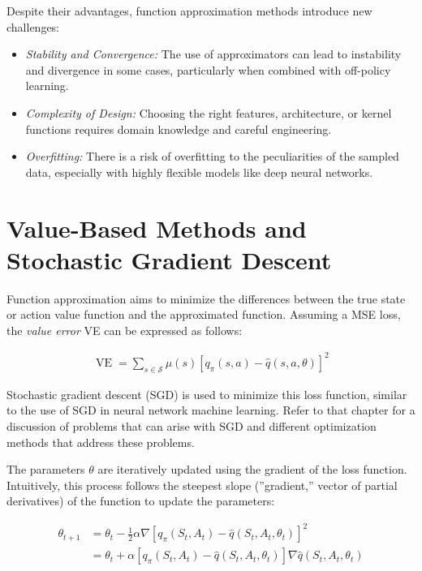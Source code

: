 Despite their advantages, function approximation methods introduce new challenges:
\begin{itemize}
\item \emph{Stability and Convergence:} The use of approximators can lead to instability and divergence in some cases, particularly when combined with off-policy learning.
\item \emph{Complexity of Design:} Choosing the right features, architecture, or kernel functions requires domain knowledge and careful engineering.
\item \emph{Overfitting:} There is a risk of overfitting to the peculiarities of the sampled data, especially with highly flexible models like deep neural networks.
\end{itemize}

\section{Value-Based Methods and Stochastic Gradient Descent}

Function approximation aims to minimize the differences between the true state or action value function and the approximated function. Assuming a MSE loss, the \emph{value error} VE can be expressed as follows:

\begin{align*}
\operatorname{VE} = \sum_{s \in \mathcal{S}} \mu(s) \left[ q_\pi(s, a) - \hat{q}(s, a, \theta) \right]^2
\end{align*}

Stochastic gradient descent (SGD) is used to minimize this loss function, similar to the use of SGD in neural network machine learning. Refer to that chapter for a discussion of problems that can arise with SGD and different optimization methods that address these problems. 

The parameters $\theta$ are iteratively updated using the gradient of the loss function. Intuitively, this process follows the steepest slope (''gradient,'' vector of partial derivatives) of the function to update the parameters:

\begin{align*}
\theta_{t+1} &= \theta_t - \frac{1}{2} \alpha \nabla \left[ q_\pi(S_t, A_t) - \hat{q}(S_t, A_t,  \theta_t)\right]^2 \\
 &= \theta_t + \alpha \left[ q_\pi(S_t, A_t) - \hat{q}(S_t, A_t, \theta_t)\right] \nabla \hat{q}(S_t, A_t, \theta_t)
\end{align*}


